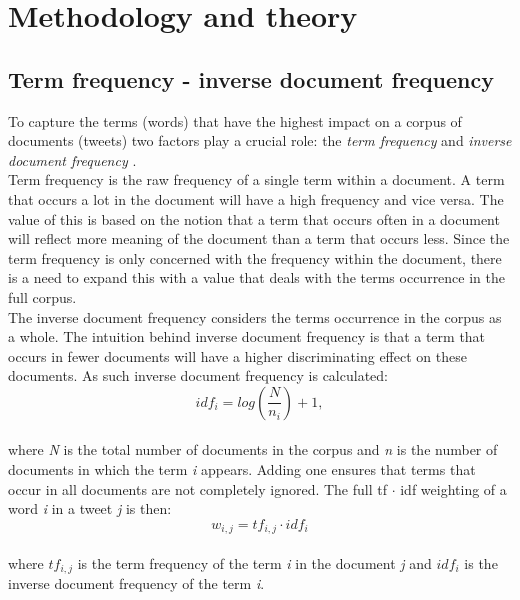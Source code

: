 \section{Methodology and theory}

\subsection{Term frequency - inverse document frequency}
To capture the terms (words) that have the highest impact on a corpus of documents (tweets) two factors play a crucial role: the \textit{term frequency} and \textit{inverse document frequency} \cite{speech}.\\
Term frequency is the raw frequency of a single term within a document. A term that occurs a lot in the document will have a high frequency and vice versa. The value of this is based on the notion that a term that occurs often in a document will reflect more meaning of the document than a term that occurs less. Since the term frequency is only concerned with the frequency within the document, there is a need to expand this with a value that deals with the terms occurrence in the full corpus.\\
The inverse document frequency considers the terms occurrence in the corpus as a whole. The intuition behind inverse document frequency is that a term that occurs in fewer documents will have a higher discriminating effect on these documents. As such inverse document frequency is calculated:\\
\begin{equation} 
id f_{i} = log \left(\dfrac{N}{n_{i}}\right)+1,
\end{equation}\\
where \textit{N} is the total number of documents in the corpus and \textit{n} is the number of documents in which the term \textit{i} appears. Adding one ensures that terms that occur in all documents are not completely ignored. The full tf $\cdot$ idf weighting of a word \textit{i} in a tweet \textit{j} is then:\\
\begin{equation} 
w_{i,j}= tf_{i,j}\cdot id f_{i}
\end{equation}\\
where $tf_{i,j}$ is the term frequency of the term \textit{i} in the document \textit{j} and $id f_{i}$ is the inverse document frequency of the term \textit{i}.

